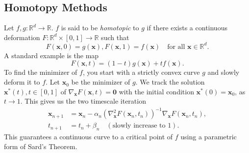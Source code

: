 \subsection*{Homotopy Methods}

Let $f,g \colon \mathbb{R}^d \to \mathbb{R}$. $f$ is said to be \textit{homotopic} to $g$ if there exists a continuous deformation $F \colon \mathbb{R}^d \times [0,1] \to \mathbb{R}$ such that 
\[
    F(\mathbf{x},0) = g(\mathbf{x}), F(\mathbf{x},1) = f(\mathbf{x}) \quad \text{for all } \mathbf{x} \in \mathbb{R}^d. 
\]
A standard example is the map
\[
    F(\mathbf{x},t) = (1-t) g(\mathbf{x}) + t f(\mathbf{x}).
\]
To find the minimizer of $f$, you start with a strictly convex curve $g$ and slowly deform it to $f$. Let $\mathbf{x}_0$ be the minimizer of $g$. We track the solution $\mathbf{x}^*(t), t \in [0,1]$ of $\nabla_{\mathbf{x}} F(\mathbf{x},t) = \mathbf{0}$ with the initial condition $\mathbf{x}^*(0) = \mathbf{x}_0$, as $t \to 1$. This gives us the two timescale iteration
\begin{align*}
    \mathbf{x}_{n+1} &= \mathbf{x}_n - \alpha_n \left( \nabla_{\mathbf{x}}^2 F(\mathbf{x}_n, t_n) \right)^{-1} \nabla_{\mathbf{x}} F(\mathbf{x}_n, t_n), \\
    t_{n+1} &= t_n + \beta_n \quad (\text{slowly increase to } 1). 
\end{align*}
This guarantees a continuous curve to a critical point of $f$ using a parametric form of Sard's Theorem. 